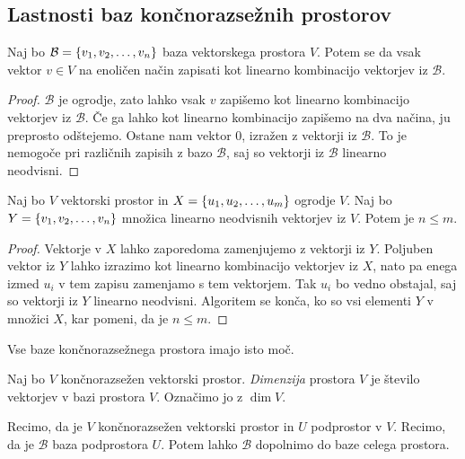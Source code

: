 \documentclass[12pt, a4paper]{article}
\begin{document}
\newpage

\subsection{Lastnosti baz končnorazsežnih prostorov}

\begin{trditev}
Naj bo $\mathcal{B}=\left\{v_1,v_2,\dots,v_n\right\}$ baza vektorskega prostora $V$. Potem se da vsak vektor $v\in V$ na enoličen način zapisati kot linearno kombinacijo vektorjev iz $\mathcal{B}$.
\end{trditev}

\begin{proof}
$\mathcal{B}$ je ogrodje, zato lahko vsak $v$ zapišemo kot linearno kombinacijo vektorjev iz $\mathcal{B}$. Če ga lahko kot linearno kombinacijo zapišemo na dva načina, ju preprosto odštejemo. Ostane nam vektor $0$, izražen z vektorji iz $\mathcal{B}$. To je nemogoče pri različnih zapisih z bazo $\mathcal{B}$, saj so vektorji iz $\mathcal{B}$ linearno neodvisni.
\end{proof}

\begin{lema}\label{lm:ineq}
Naj bo $V$ vektorski prostor in $X=\left\{u_1,u_2,\dots,u_m\right\}$ ogrodje $V$. Naj bo $Y=\left\{v_1,v_2,\dots,v_n\right\}$ množica linearno neodvisnih vektorjev iz $V$. Potem je $n\leq m$.
\end{lema}

\begin{proof}
Vektorje v $X$ lahko zaporedoma zamenjujemo z vektorji iz $Y$. Poljuben vektor iz $Y$ lahko izrazimo kot linearno kombinacijo vektorjev iz $X$, nato pa enega izmed $u_i$ v tem zapisu zamenjamo s tem vektorjem. Tak $u_i$ bo vedno obstajal, saj so vektorji iz $Y$ linearno neodvisni. Algoritem se konča, ko so vsi elementi $Y$ v množici $X$, kar pomeni, da je $n\leq m$.
\end{proof}

\begin{posledica}
Vse baze končnorazsežnega prostora imajo isto moč.
\end{posledica}

\begin{definicija}
Naj bo $V$ končnorazsežen vektorski prostor. \emph{Dimenzija} prostora $V$ je število vektorjev v bazi prostora $V$. Označimo jo z $\dim V$.
\end{definicija}

\begin{trditev}
Recimo, da je $V$ končnorazsežen vektorski prostor in $U$ podprostor v $V$. Recimo, da je $\mathcal{B}$ baza podprostora $U$. Potem lahko $\mathcal{B}$ dopolnimo do baze celega prostora.
\end{trditev}
\end{document}
